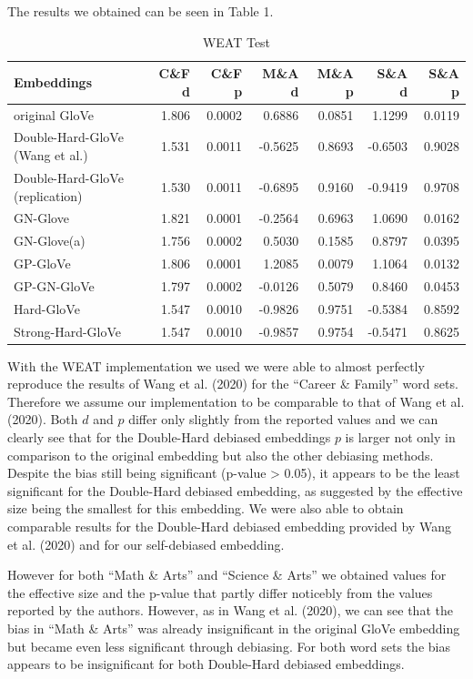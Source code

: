 \documentclass[
  english,
  man,floatsintext]{apa6}
\begin{document}
The results we obtained can be seen in Table 1.

\begin{table}

\caption{\label{tab:unnamed-chunk-1}WEAT Test}
\centering
\begin{tabular}[t]{l|r|r|r|r|r|r}
\hline
Embeddings & C\&F d & C\&F p & M\&A d & M\&A p & S\&A d & S\&A p\\
\hline
original GloVe & 1.806 & 0.0002 & 0.6886 & 0.0851 & 1.1299 & 0.0119\\
\hline
Double-Hard-GloVe (Wang et al.) & 1.531 & 0.0011 & -0.5625 & 0.8693 & -0.6503 & 0.9028\\
\hline
Double-Hard-GloVe (replication) & 1.530 & 0.0011 & -0.6895 & 0.9160 & -0.9419 & 0.9708\\
\hline
GN-Glove & 1.821 & 0.0001 & -0.2564 & 0.6963 & 1.0690 & 0.0162\\
\hline
GN-Glove(a) & 1.756 & 0.0002 & 0.5030 & 0.1585 & 0.8797 & 0.0395\\
\hline
GP-GloVe & 1.806 & 0.0001 & 1.2085 & 0.0079 & 1.1064 & 0.0132\\
\hline
GP-GN-GloVe & 1.797 & 0.0002 & -0.0126 & 0.5079 & 0.8460 & 0.0453\\
\hline
Hard-GloVe & 1.547 & 0.0010 & -0.9826 & 0.9751 & -0.5384 & 0.8592\\
\hline
Strong-Hard-GloVe & 1.547 & 0.0010 & -0.9857 & 0.9754 & -0.5471 & 0.8625\\
\hline
\end{tabular}
\end{table}

With the WEAT implementation we used we were able to almost perfectly reproduce the results of Wang et al. (2020) for the ``Career \& Family'' word sets. Therefore we assume our implementation to be comparable to that of Wang et al. (2020). Both \(d\) and \(p\) differ only slightly from the reported values and we can clearly see that for the Double-Hard debiased embeddings \(p\) is larger not only in comparison to the original embedding but also the other debiasing methods. Despite the bias still being significant (p-value \textgreater{} 0.05), it appears to be the least significant for the Double-Hard debiased embedding, as suggested by the effective size being the smallest for this embedding. We were also able to obtain comparable results for the Double-Hard debiased embedding provided by Wang et al. (2020) and for our self-debiased embedding.

However for both ``Math \& Arts'' and ``Science \& Arts'' we obtained values for the effective size and the p-value that partly differ noticebly from the values reported by the authors. However, as in Wang et al. (2020), we can see that the bias in ``Math \& Arts'' was already insignificant in the original GloVe embedding but became even less significant through debiasing. For both word sets the bias appears to be insignificant for both Double-Hard debiased embeddings.
\end{document}
